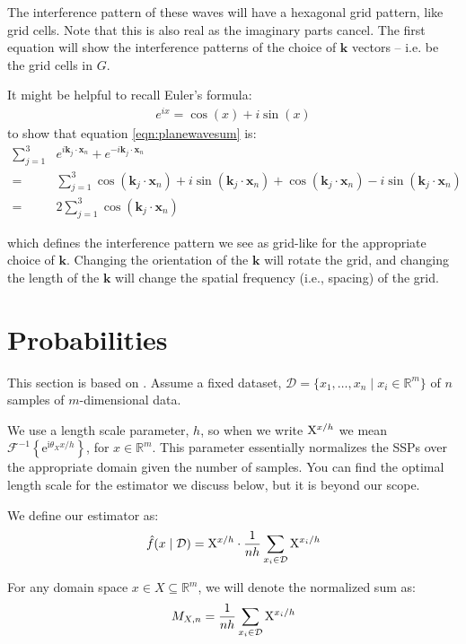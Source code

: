 \documentclass[10pt,letterpaper,oneside]{article}
\newcommand{\ssp}[1]{\mathrm{\uppercase{#1}}^{\lowercase{#1}/h}}
\newcommand{\sspi}[2]{\mathrm{\uppercase{#1}}^{\lowercase{#1}_{#2}/h}}
\begin{document}
The interference pattern of these waves will have a hexagonal grid pattern, like grid cells. Note that this is also real as the imaginary parts cancel. The first equation will show the interference patterns of the choice of $\mathbf{k}$ vectors -- i.e. be the grid cells in $G$.

It might be helpful to recall Euler's formula: 
\begin{align}
   e^{i x} = \cos(x) + i \sin(x)
\end{align}
to show that equation \ref{eqn:planewavesum} is:
\begin{align}
  \sum_{j=1}^{3} & e^{i \mathbf{k}_j \cdot \mathbf{x}_n } + e^{-i \mathbf{k}_j \cdot \mathbf{x}_n } \\
  =&  \sum_{j=1}^{3} \cos(\mathbf{k}_j \cdot \mathbf{x}_n) + i \sin(\mathbf{k}_j \cdot \mathbf{x}_n) + \cos(\mathbf{k}_j \cdot \mathbf{x}_n) - i \sin(\mathbf{k}_j \cdot \mathbf{x}_n) \\
  =& 2 \sum_{j=1}^{3} \cos(\mathbf{k}_j \cdot \mathbf{x}_n)
\end{align}

which defines the interference pattern we see as grid-like for the appropriate choice of $\mathbf{k}$. Changing the orientation of the $\mathbf{k}$ will rotate the grid, and changing the length of the $\mathbf{k}$ will change the spatial frequency (i.e., spacing) of the grid.

\section{Probabilities}

This section is based on \cite{furlong2022fractional}. Assume a fixed dataset, $\mathcal{D} = \{x_{1},\ldots,x_{n}\mid x_{i} \in \mathbb{R}^{m}\}$ of $n$ samples of $m$-dimensional data. 

We use a length scale parameter, $h$, so when we write $\ssp{x}$ we mean $\mathcal{F}^{-1}\left\{\mathrm{e}^{\mathrm{i}\theta_{X}x/h}\right\}$, for $x \in \mathbb{R}^{m}$. This parameter essentially normalizes the SSPs over the appropriate domain given the number of samples. You can find the optimal length scale for the estimator we discuss below, but it is beyond our scope.

We define our estimator as: 
\begin{align}
  \hat{f}(x\mid \mathcal{D}) = \ssp{x}\cdot \frac{1}{nh}\sum_{x_{i} \in \mathcal{D}} \sspi{x}{i}
\end{align} 

For any domain space $x \in X \subseteq \mathbb{R}^{m}$, we will denote the normalized sum as:
\begin{align}
M_{X,n} = \frac{1}{nh}\sum_{x_{i} \in \mathcal{D}}\sspi{x}{i}
\end{align}
\end{document}
